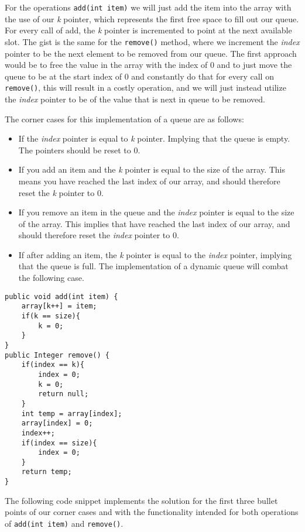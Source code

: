 \documentclass[a4paper,11pt]{article}
\begin{document}
        For the operations \texttt{add(int item)} we will just add the item into the array with the use of our \textit{k} pointer, which represents the first free space to fill out our queue. For every call of add, the \textit{k} pointer is incremented to point at the next available slot. The gist is the same for the \texttt{remove()} method, where we increment the \textit{index} pointer to be the next element to be removed from our queue. The first approach would be to free the value in the array with the index of 0 and to just move the queue to be at the start index of 0 and constantly do that for every call on \texttt{remove()}, this will result in a costly operation, and we will just instead utilize the \textit{index} pointer to be of the value that is next in queue to be removed.

        The corner cases for this implementation of a queue are as follows:
        \begin{itemize}
            \item If the \textit{index} pointer is equal to \textit{k} pointer. Implying that the queue is empty. The pointers should be reset to 0.
            \item If you add an item and the \textit{k} pointer is equal to the size of the array. This means you have reached the last index of our array, and should therefore reset the \textit{k} pointer to 0.
            \item If you remove an item in the queue and the \textit{index} pointer is equal to the size of the array. This implies that have reached the last index of our array, and should therefore reset the \textit{index} pointer to 0.
            \item If after adding an item, the \textit{k} pointer is equal to the \textit{index} pointer, implying that the queue is full. The implementation of a dynamic queue will combat the following case.
        \end{itemize}
        \begin{verbatim}
public void add(int item) {
    array[k++] = item;
    if(k == size){
        k = 0;
    }
}
public Integer remove() {
    if(index == k){
        index = 0;
        k = 0;
        return null;
    }
    int temp = array[index];
    array[index] = 0;
    index++;
    if(index == size){
        index = 0;
    }
    return temp;
}
        \end{verbatim}
        The following code snippet implements the solution for the first three bullet points of our corner cases and with the functionality intended for both operations of \texttt{add(int item)} and \texttt{remove()}.
\end{document}
